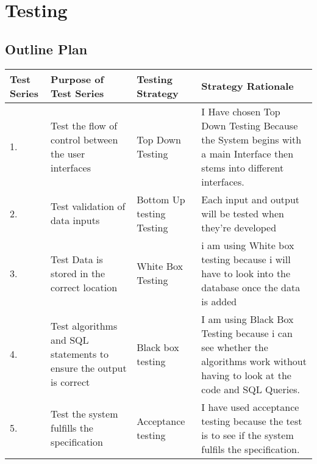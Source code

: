 \section{Testing}
\begin{landscape}

\subsection{Outline Plan}
\begin{center}
    \begin{tabular}{|p{2cm}|p{5cm}|p{5cm}|p{4cm}|}
        \hline

        \textbf{Test Series} & \textbf{Purpose of Test Series} & \textbf{Testing Strategy} & \textbf{Strategy Rationale}\\ \hline
	1. & Test the flow of control between the user interfaces & Top Down Testing & I Have chosen Top Down Testing Because the System begins with a main Interface then stems into different interfaces. \\ \hline
	2. & Test validation of data inputs & Bottom Up testing Testing &  Each input and output will be tested when they're developed\\ \hline
	3. & Test Data is stored in the correct location & White Box Testing & i am using White box testing because i will have to look into the database once the data is added \\ \hline
	4. & Test algorithms and SQL statements to ensure the output is correct & Black box testing & I am using Black Box Testing because i can see whether the algorithms work without having to look at the code and SQL Queries. \\ \hline
	5. & Test the system fulfills the specification & Acceptance testing & I have used acceptance testing because the test is to see if the system fulfils the specification. \\ \hline

    \end{tabular}
\end{center}


\end{landscape}
